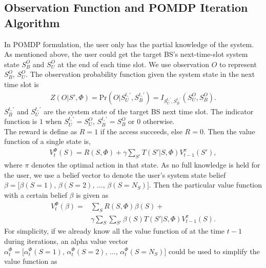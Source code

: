 \documentclass[conference]{IEEEtran}
\begin{document}
\subsection{Observation Function and POMDP Iteration Algorithm}
In POMDP formulation, the user only has the partial knowledge of the system.
As mentioned above, the user could get the target BS's next-time-slot system state
\(S_B^O\) and \(S_U^O\) at the end of each time slot.
We use observation \(O\) to represent \(S_B^O,\,S_U^O\).
The observation probability function given the system state in the next time slot is
\begin{align}
	Z\left(O|S',\Phi\right) = \mbox{Pr}\left(O\Big|S_U^{t,'}, S_B^{t,'}\right) =
	I_{S_U^{t,'},S_B^{t,'}}\left(S_U^O, S_B^O\right).
\end{align}
\(S_B^{t,'}\) and \(S_U^{t,'}\) are the system state of the target BS next time slot.
The indicator function is \(1\) when \(S_U^{t,'} = S_U^O,\,S_B^{t,'}=S_B^O\) or \(0\) otherwise.\\\indent
The reward is define as \(R = 1\) if the access succeeds, else \(R= 0\).
Then the value function of a single state is,
\begin{equation}
\begin{aligned}
	V_t^\Phi\left(S\right) = R\left(S,\Phi\right) +\gamma\sum\limits_{S'}T\left(S'|S,\Phi\right)V_{t-1}^\pi\left(S'\right),
\end{aligned}
\end{equation}
where \(\pi\) denotes the optimal action in that state.
As no full knowledge is held for the user, we use a belief vector to denote the user's system state belief
\(\beta = \lbrack \beta\left(S = 1\right),\,\beta\left(S = 2\right),\,\ldots,\,\beta\left(S = N_S\right)\rbrack\).	
Then the particular value function with a certain belief \(\beta\) is given as
\begin{equation}
\begin{aligned}
	V_t^\Phi\left(\beta\right) = & \sum\limits_{S}R\left(S,\Phi\right)\beta\left(S\right) +\\
	&	\gamma\sum\limits_{S}\sum\limits_{S'}\beta\left(S\right)T\left(S'|S,\Phi\right)V_{t-1}^\pi\left(S\right).
\end{aligned}
\end{equation}
For simplicity, if we already know all the value function of at the time \(t-1\) during iterations,
an alpha value vector \(\alpha_t^\Phi = \lbrack \alpha_t^\Phi\left(S = 1\right),\,
\alpha_t^\Phi\left(S = 2\right),\,\ldots,\,\alpha_t^\Phi\left(S = N_S\right)\rbrack\)
could be used to simplify the value function as
\end{document}
